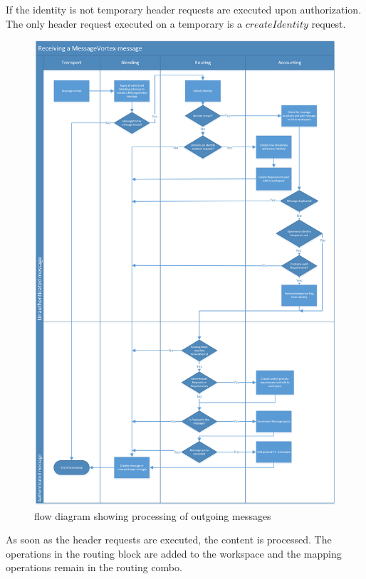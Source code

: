 If the identity is not temporary header requests are executed upon authorization. The only header request executed on a temporary  is a $createIdentity$ request. 

\begin{figure}[ht]
	\centering
	\includegraphics[height=0.75\textheight]{inc/flowchart_message_receiving}
	\caption{flow diagram showing processing of outgoing messages}
	\label{fig:msgReceiveProcessing}
\end{figure}

As soon as the header requests are executed, the content is processed. The operations in the routing block are added to the workspace and the mapping operations remain in the routing combo. 

